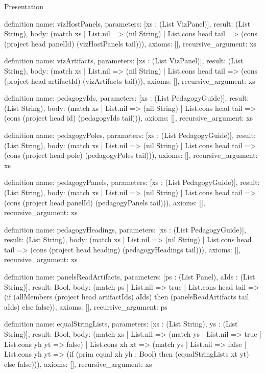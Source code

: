 \begin{lexlean}{Presentation}
\begin{semanticmodule}
definition{
  name: vizHostPanels,
  parameters: [xs : (List VizPanel)],
  result: (List String),
  body: (match xs
    | List.nil => (nil String)
    | List.cons head tail => (cons (project head panelId) (vizHostPanels tail))),
  axioms: [],
  recursive_argument: xs
}

definition{
  name: vizArtifacts,
  parameters: [xs : (List VizPanel)],
  result: (List String),
  body: (match xs
    | List.nil => (nil String)
    | List.cons head tail => (cons (project head artifactId) (vizArtifacts tail))),
  axioms: [],
  recursive_argument: xs
}

definition{
  name: pedagogyIds,
  parameters: [xs : (List PedagogyGuide)],
  result: (List String),
  body: (match xs
    | List.nil => (nil String)
    | List.cons head tail => (cons (project head id) (pedagogyIds tail))),
  axioms: [],
  recursive_argument: xs
}

definition{
  name: pedagogyPoles,
  parameters: [xs : (List PedagogyGuide)],
  result: (List String),
  body: (match xs
    | List.nil => (nil String)
    | List.cons head tail => (cons (project head pole) (pedagogyPoles tail))),
  axioms: [],
  recursive_argument: xs
}

definition{
  name: pedagogyPanels,
  parameters: [xs : (List PedagogyGuide)],
  result: (List String),
  body: (match xs
    | List.nil => (nil String)
    | List.cons head tail => (cons (project head panelId) (pedagogyPanels tail))),
  axioms: [],
  recursive_argument: xs
}

definition{
  name: pedagogyHeadings,
  parameters: [xs : (List PedagogyGuide)],
  result: (List String),
  body: (match xs
    | List.nil => (nil String)
    | List.cons head tail => (cons (project head heading) (pedagogyHeadings tail))),
  axioms: [],
  recursive_argument: xs
}

definition{
  name: panelsReadArtifacts,
  parameters: [ps : (List Panel), aIds : (List String)],
  result: Bool,
  body: (match ps
    | List.nil => true
    | List.cons head tail => (if (allMembers (project head artifactIds) aIds) then (panelsReadArtifacts tail aIds) else false)),
  axioms: [],
  recursive_argument: ps
}

definition{
  name: equalStringLists,
  parameters: [xs : (List String), ys : (List String)],
  result: Bool,
  body: (match xs
    | List.nil => (match ys | List.nil => true | List.cons yh yt => false)
    | List.cons xh xt => (match ys
      | List.nil => false
      | List.cons yh yt => (if (prim equal xh yh : Bool) then (equalStringLists xt yt) else false))),
  axioms: [],
  recursive_argument: xs
}


\end{semanticmodule}
\end{lexlean}
